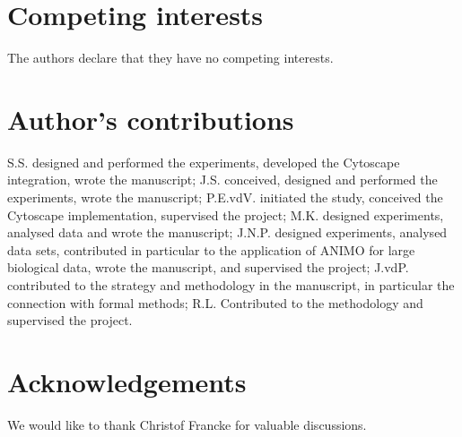 \documentclass{bmcart}
\begin{document}
\begin{backmatter}

\section*{Competing interests}
The authors declare that they have no competing interests.

\section*{Author's contributions}
S.S. designed and performed the experiments, developed the Cytoscape integration, wrote the manuscript;
J.S. conceived, designed and performed the experiments, wrote the manuscript;
P.E.vdV. initiated the study, conceived the Cytoscape implementation, supervised the project;
M.K. designed experiments, analysed data and wrote the manuscript;
J.N.P. designed experiments, analysed data sets, contributed in particular to the application of ANIMO for large biological data, wrote the manuscript, and supervised the project;
J.vdP. contributed to the strategy and methodology in the manuscript, in particular the connection with formal methods;
R.L. Contributed to the methodology and supervised the project.

\section*{Acknowledgements}
We would like to thank Christof Francke for valuable discussions.

%


\end{backmatter}
\end{document}

